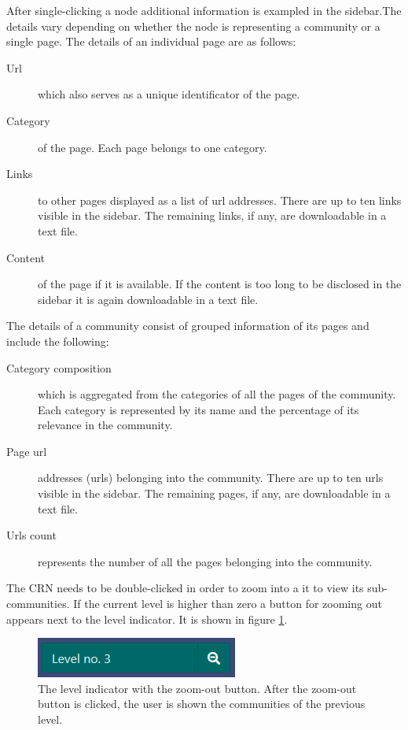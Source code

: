 After single-clicking a node additional information is exampled in the sidebar.The details vary depending on whether the node is representing a community or a single page.  
The details of an individual page are as follows: 
\begin {description}
	\item [Url] which also serves as a unique identificator of the page. 
	\item [Category] of the page. Each page belongs to one category.
	\item[Links] to other pages displayed as a list of url addresses. There are up to ten links visible in the sidebar. The remaining links, if any, are downloadable in a text file. 
	\item[Content] of the page if it is available. If the content is too long to be disclosed in the sidebar it is again downloadable in a text file.
\end{description}


The details of a community consist of  grouped information of its pages and include the following:
\begin {description}
	\item [Category composition] which is aggregated from the categories of all the pages of the community. Each category is represented by its name and the percentage of its relevance in the community.
	\item [Page url] addresses (urls) belonging into the community. There are up to ten urls visible in the sidebar. The remaining pages, if any, are downloadable in a text file. 
	\item[Urls count]represents the number of all the pages belonging into the community. 
\end{description}

The CRN needs to be double-clicked in order to zoom into a it to view its sub-communities. If the current level is higher than zero a button for zooming out appears next to the level indicator. It is shown in figure \ref{levelIndicatorWithButton}.
\begin{figure}[ht!]
  \centering
  \includegraphics{Images/levelIndicatorWithButton.png}
  \caption{The level indicator with the zoom-out button. After the zoom-out button is clicked, the user is shown the communities of the previous level.}
  \label{levelIndicatorWithButton}
\end{figure} 


